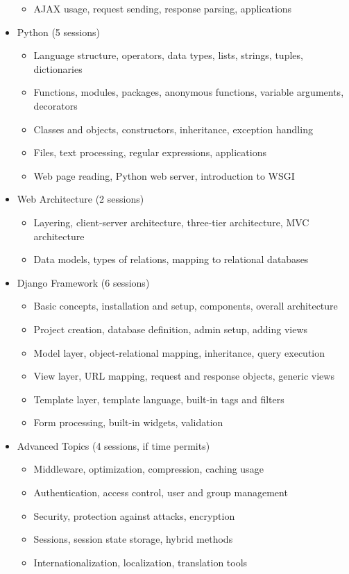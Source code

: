 \documentclass[12pt]{article}
\begin{document}
\begin{itemize}
\begin{itemize}
        \item AJAX usage, request sending, response parsing, applications
    \end{itemize}
    \item Python (5 sessions)
    \begin{itemize}
        \item Language structure, operators, data types, lists, strings, tuples, dictionaries
        \item Functions, modules, packages, anonymous functions, variable arguments, decorators
        \item Classes and objects, constructors, inheritance, exception handling
        \item Files, text processing, regular expressions, applications
        \item Web page reading, Python web server, introduction to WSGI
    \end{itemize}
    \item Web Architecture (2 sessions)
    \begin{itemize}
        \item Layering, client-server architecture, three-tier architecture, MVC architecture
        \item Data models, types of relations, mapping to relational databases
    \end{itemize}
    \item Django Framework (6 sessions)
    \begin{itemize}
        \item Basic concepts, installation and setup, components, overall architecture
        \item Project creation, database definition, admin setup, adding views
        \item Model layer, object-relational mapping, inheritance, query execution
        \item View layer, URL mapping, request and response objects, generic views
        \item Template layer, template language, built-in tags and filters
        \item Form processing, built-in widgets, validation
    \end{itemize}
    \item Advanced Topics (4 sessions, if time permits)
    \begin{itemize}
        \item Middleware, optimization, compression, caching usage
        \item Authentication, access control, user and group management
        \item Security, protection against attacks, encryption
        \item Sessions, session state storage, hybrid methods
        \item Internationalization, localization, translation tools
    \end{itemize}
\end{itemize}
\end{document}
